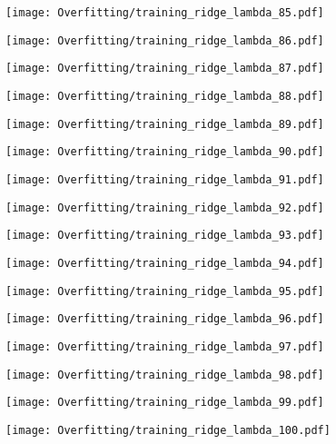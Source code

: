 \documentclass[xcolor=pdftex,dvipsnames,table]{beamer}
\begin{document}
\frame
{
	\begin{center}
		\texttt{[image: Overfitting/training\_ridge\_lambda\_85.pdf]}
	\end{center}
}
\frame
{
	\begin{center}
		\texttt{[image: Overfitting/training\_ridge\_lambda\_86.pdf]}
	\end{center}
}
\frame
{
	\begin{center}
		\texttt{[image: Overfitting/training\_ridge\_lambda\_87.pdf]}
	\end{center}
}
\frame
{
	\begin{center}
		\texttt{[image: Overfitting/training\_ridge\_lambda\_88.pdf]}
	\end{center}
}
\frame
{
	\begin{center}
		\texttt{[image: Overfitting/training\_ridge\_lambda\_89.pdf]}
	\end{center}
}
\frame
{
	\begin{center}
		\texttt{[image: Overfitting/training\_ridge\_lambda\_90.pdf]}
	\end{center}
}
\frame
{
	\begin{center}
		\texttt{[image: Overfitting/training\_ridge\_lambda\_91.pdf]}
	\end{center}
}
\frame
{
	\begin{center}
		\texttt{[image: Overfitting/training\_ridge\_lambda\_92.pdf]}
	\end{center}
}
\frame
{
	\begin{center}
		\texttt{[image: Overfitting/training\_ridge\_lambda\_93.pdf]}
	\end{center}
}
\frame
{
	\begin{center}
		\texttt{[image: Overfitting/training\_ridge\_lambda\_94.pdf]}
	\end{center}
}
\frame
{
	\begin{center}
		\texttt{[image: Overfitting/training\_ridge\_lambda\_95.pdf]}
	\end{center}
}
\frame
{
	\begin{center}
		\texttt{[image: Overfitting/training\_ridge\_lambda\_96.pdf]}
	\end{center}
}
\frame
{
	\begin{center}
		\texttt{[image: Overfitting/training\_ridge\_lambda\_97.pdf]}
	\end{center}
}
\frame
{
	\begin{center}
		\texttt{[image: Overfitting/training\_ridge\_lambda\_98.pdf]}
	\end{center}
}
\frame
{
	\begin{center}
		\texttt{[image: Overfitting/training\_ridge\_lambda\_99.pdf]}
	\end{center}
}
\frame
{
	\begin{center}
		\texttt{[image: Overfitting/training\_ridge\_lambda\_100.pdf]}
	\end{center}
}
\end{document}
